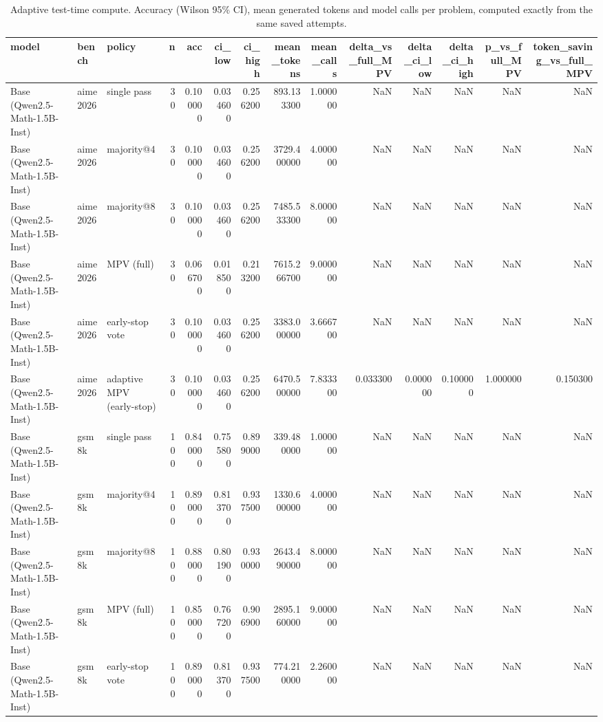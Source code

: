\begin{table}
\caption{Adaptive test-time compute. Accuracy (Wilson 95\% CI), mean generated tokens and model calls per problem, computed exactly from the same saved attempts.}
\label{tab:adaptive_mpv}
\begin{tabular}{lllrrrrrrrrrrr}
\toprule
model & bench & policy & n & acc & ci_low & ci_high & mean_tokens & mean_calls & delta_vs_full_MPV & delta_ci_low & delta_ci_high & p_vs_full_MPV & token_saving_vs_full_MPV \\
\midrule
Base (Qwen2.5-Math-1.5B-Inst) & aime2026 & single pass & 30 & 0.100000 & 0.034600 & 0.256200 & 893.133300 & 1.000000 & NaN & NaN & NaN & NaN & NaN \\
Base (Qwen2.5-Math-1.5B-Inst) & aime2026 & majority@4 & 30 & 0.100000 & 0.034600 & 0.256200 & 3729.400000 & 4.000000 & NaN & NaN & NaN & NaN & NaN \\
Base (Qwen2.5-Math-1.5B-Inst) & aime2026 & majority@8 & 30 & 0.100000 & 0.034600 & 0.256200 & 7485.533300 & 8.000000 & NaN & NaN & NaN & NaN & NaN \\
Base (Qwen2.5-Math-1.5B-Inst) & aime2026 & MPV (full) & 30 & 0.066700 & 0.018500 & 0.213200 & 7615.266700 & 9.000000 & NaN & NaN & NaN & NaN & NaN \\
Base (Qwen2.5-Math-1.5B-Inst) & aime2026 & early-stop vote & 30 & 0.100000 & 0.034600 & 0.256200 & 3383.000000 & 3.666700 & NaN & NaN & NaN & NaN & NaN \\
Base (Qwen2.5-Math-1.5B-Inst) & aime2026 & adaptive MPV (early-stop) & 30 & 0.100000 & 0.034600 & 0.256200 & 6470.500000 & 7.833300 & 0.033300 & 0.000000 & 0.100000 & 1.000000 & 0.150300 \\
Base (Qwen2.5-Math-1.5B-Inst) & gsm8k & single pass & 100 & 0.840000 & 0.755800 & 0.899000 & 339.480000 & 1.000000 & NaN & NaN & NaN & NaN & NaN \\
Base (Qwen2.5-Math-1.5B-Inst) & gsm8k & majority@4 & 100 & 0.890000 & 0.813700 & 0.937500 & 1330.600000 & 4.000000 & NaN & NaN & NaN & NaN & NaN \\
Base (Qwen2.5-Math-1.5B-Inst) & gsm8k & majority@8 & 100 & 0.880000 & 0.801900 & 0.930000 & 2643.490000 & 8.000000 & NaN & NaN & NaN & NaN & NaN \\
Base (Qwen2.5-Math-1.5B-Inst) & gsm8k & MPV (full) & 100 & 0.850000 & 0.767200 & 0.906900 & 2895.160000 & 9.000000 & NaN & NaN & NaN & NaN & NaN \\
Base (Qwen2.5-Math-1.5B-Inst) & gsm8k & early-stop vote & 100 & 0.890000 & 0.813700 & 0.937500 & 774.210000 & 2.260000 & NaN & NaN & NaN & NaN & NaN \\

\end{tabular}
\end{table}

